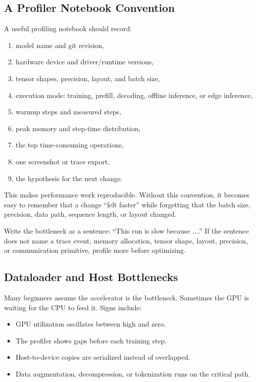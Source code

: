 \subsection{A Profiler Notebook Convention}

A useful profiling notebook should record:
\begin{enumerate}
  \item model name and git revision,
  \item hardware device and driver/runtime versions,
  \item tensor shapes, precision, layout, and batch size,
  \item execution mode: training, prefill, decoding, offline inference, or edge inference,
  \item warmup steps and measured steps,
  \item peak memory and step-time distribution,
  \item the top time-consuming operations,
  \item one screenshot or trace export,
  \item the hypothesis for the next change.
\end{enumerate}

This makes performance work reproducible. Without this convention, it becomes easy to remember that a change ``felt faster'' while forgetting that the batch size, precision, data path, sequence length, or layout changed.

\begin{aside}
Write the bottleneck as a sentence: ``This run is slow because \(\ldots\).'' If the sentence does not name a trace event, memory allocation, tensor shape, layout, precision, or communication primitive, profile more before optimizing.
\end{aside}

\subsection{Dataloader and Host Bottlenecks}

Many beginners assume the accelerator is the bottleneck. Sometimes the GPU is waiting for the CPU to feed it. Signs include:

\begin{itemize}[leftmargin=*]
  \item GPU utilization oscillates between high and zero.
  \item The profiler shows gaps before each training step.
  \item Host-to-device copies are serialized instead of overlapped.
  \item Data augmentation, decompression, or tokenization runs on the critical path.
\end{itemize}

